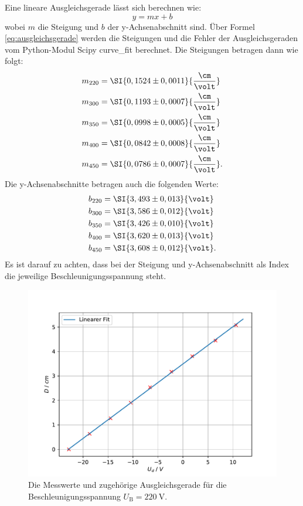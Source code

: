 Eine lineare Ausgleichsgerade lässt sich berechnen wie:
\begin{equation}
\label{eq:ausgleichsgerade}
y = mx + b
\end{equation}
wobei $m$ die Steigung und $b$ der y-Achsenabschnitt sind. Über Formel \ref{eq:ausgleichsgerade} werden die Steigungen und die Fehler der Ausgleichsgeraden vom Python-Modul Scipy curve\_fit berechnet.
Die Steigungen betragen dann wie folgt:
\begin{align*}
    m_{220} &= \SI{0,1524 \pm 0,0011}{\frac{\cm}{\volt}} \\
    m_{300} &= \SI{0,1193 \pm 0,0007}{\frac{\cm}{\volt}} \\
    m_{350} &= \SI{0,0998 \pm 0,0005}{\frac{\cm}{\volt}} \\
    m_{400} &= \SI{0,0842 \pm 0,0008}{\frac{\cm}{\volt}} \\
    m_{450} &= \SI{0,0786 \pm 0,0007}{\frac{\cm}{\volt}}.
\end{align*}
Die y-Achsenabschnitte betragen auch die folgenden Werte:
\begin{align*}
	 b_{220} &= \SI{3,493 \pm 0,013}{\volt} \\
	 b_{300} &= \SI{3,586 \pm 0,012}{\volt} \\
	 b_{350} &= \SI{3,426 \pm 0,010}{\volt} \\
	 b_{400} &= \SI{3,620 \pm 0,013}{\volt} \\
	 b_{450} &= \SI{3,608 \pm 0,012}{\volt}.
\end{align*}
Es ist darauf zu achten, dass bei der Steigung und y-Achsenabschnitt als Index die jeweilige Beschleunigungsspannung steht. 

\begin{figure}[h!]
	\centering
	\includegraphics[width=0.7\linewidth]{../../Leuchtpunktverschiebung1}
	\caption{Die Messwerte und zugehörige Ausgleichsgerade für die Beschleunigungsspannung $U_\text{B} = \SI{220}{\volt}$.}
	\label{fig:leuchtpunktverschiebung1}
\end{figure}

